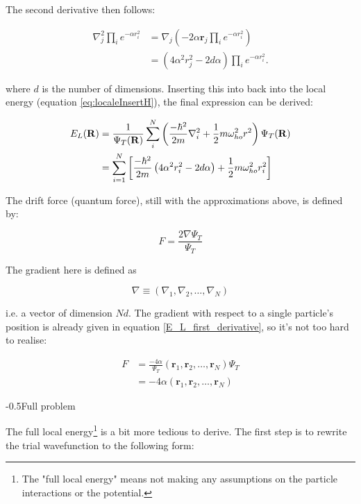 \documentclass[english, a4paper]{article}
\makeatletter
\newcommand\lr[1]{\left(#1\right)}
\renewcommand{\subsubsection}{\@startsection{subsubsection}{3}{0pt}%
{-\baselineskip}{0.5\baselineskip}{\bf\large}}
\newcommand{\bm}[1]{\mathbf{#1}}
\makeatother
\begin{document}
The second derivative then follows:

\begin{align}
 \nabla_j^2 \prod_i e^{-\alpha r_i^2} 
 &= \nabla_j \lr{-2\alpha \bm{r}_j  \prod_i e^{-\alpha r_i^2}}\\
 &= \lr{4\alpha^2 r_j^2 - 2d\alpha}  \prod_i e^{-\alpha r_i^2}.
\end{align}

where $d$ is the number of dimensions. Inserting this into back into the local energy (equation \eqref{eq:localeInsertH}), the final expression can be derived:

\begin{align*}
 E_L({\bf R}) &= \frac{1}{\Psi_T({\bf R})}\sum_i^N \lr{
	 \frac{-\hbar^2}{2m}
	 \nabla_{i}^2 +
	\frac{1}{2}m\omega_{ho}^2r^2}\Psi_T({\bf R})\\
    &= \sum_{i=1}^N\left[\frac{-\hbar^2}{2m}\lr{4\alpha^2 r_i^2 - 2d\alpha} + \frac{1}{2}m\omega_{ho}^2r_i^2\right]
\end{align*}



The drift force (quantum force), still with the approximations above, is defined by:

\begin{equation}
	F = \frac{2\nabla\Psi_T}{\Psi_T}
\end{equation}

The gradient here is defined as

\begin{equation*}
	\nabla \equiv \lr{\nabla_1,\nabla_2,\ldots,\nabla_N}
\end{equation*}

i.e. a vector of dimension $Nd$. The gradient with respect to a single particle's position is already given in equation \ref{E_L_first_derivative}, so it's not too hard to realise:

\begin{align*}
	F &= \frac{-4\alpha}{\Psi_T}\lr{\bm{r}_1,\bm{r}_2,\ldots,\bm{r}_N}\Psi_T\\
	&= -4\alpha\lr{\bm{r}_1,\bm{r}_2,\ldots,\bm{r}_N}
\end{align*}


\subsubsection{Full problem}

The full local energy\footnote{The "full local energy" means not making any assumptions on the particle interactions or the potential.} is a bit more tedious to derive. The first step is to rewrite the trial wavefunction to the following form:
\end{document}
